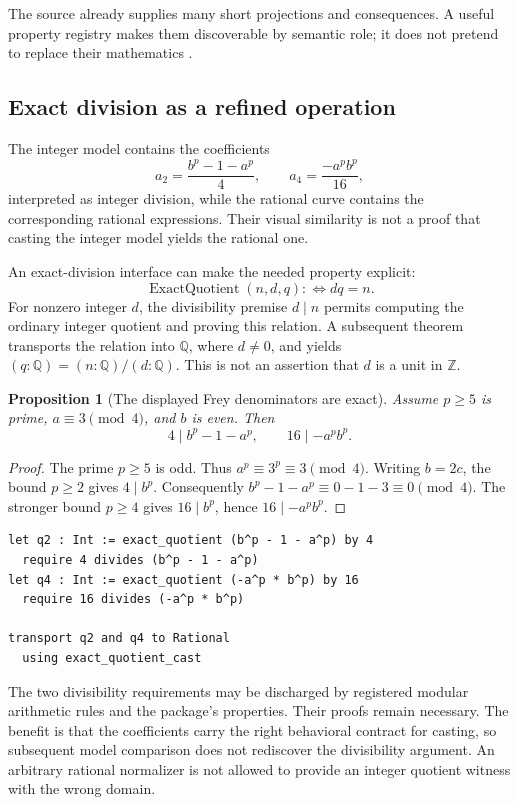 \documentclass[11pt,letterpaper]{article}
\newcommand{\Z}{\mathbb Z}
\newcommand{\Q}{\mathbb Q}
\newtheorem{proposition}[definition]{Proposition}
\theoremstyle{remark}
\begin{document}
The source already supplies many short projections and consequences. A useful
property registry makes them discoverable by semantic role; it does not
pretend to replace their mathematics \cite{freydef}.

\subsection{Exact division as a refined operation}
The integer model contains the coefficients
\[
  a_2=\frac{b^p-1-a^p}{4},
  \qquad
  a_4=\frac{-a^p b^p}{16},
\]
interpreted as integer division, while the rational curve contains the
corresponding rational expressions. Their visual similarity is not a proof
that casting the integer model yields the rational one.

An exact-division interface can make the needed property explicit:
\[
 \operatorname{ExactQuotient}(n,d,q):\Longleftrightarrow d q=n.
\]
For nonzero integer $d$, the divisibility premise $d\mid n$ permits computing
the ordinary integer quotient and proving this relation. A subsequent theorem
transports the relation into $\Q$, where $d\ne0$, and yields
$(q:\Q)=(n:\Q)/(d:\Q)$. This is not an assertion that $d$ is a unit in $\Z$.

\begin{proposition}[The displayed Frey denominators are exact]
Assume $p\ge5$ is prime, $a\equiv3\pmod4$, and $b$ is even. Then
\[
 4\mid b^p-1-a^p,
 \qquad
 16\mid -a^p b^p.
\]
\end{proposition}
\begin{proof}
The prime $p\ge5$ is odd. Thus $a^p\equiv3^p\equiv3\pmod4$.
Writing $b=2c$, the bound $p\ge2$ gives $4\mid b^p$.
Consequently $b^p-1-a^p\equiv0-1-3\equiv0\pmod4$.
The stronger bound $p\ge4$ gives $16\mid b^p$, hence
$16\mid -a^p b^p$.
\end{proof}

\begin{lstlisting}[caption={A proposed typed exact-quotient workflow.}]
let q2 : Int := exact_quotient (b^p - 1 - a^p) by 4
  require 4 divides (b^p - 1 - a^p)
let q4 : Int := exact_quotient (-a^p * b^p) by 16
  require 16 divides (-a^p * b^p)

transport q2 and q4 to Rational
  using exact_quotient_cast
\end{lstlisting}

The two divisibility requirements may be discharged by registered modular
arithmetic rules and the package's properties. Their proofs remain necessary.
The benefit is that the coefficients carry the right behavioral contract for
casting, so subsequent model comparison does not rediscover the divisibility
argument. An arbitrary rational normalizer is not allowed to provide an
integer quotient witness with the wrong domain.
\end{document}
